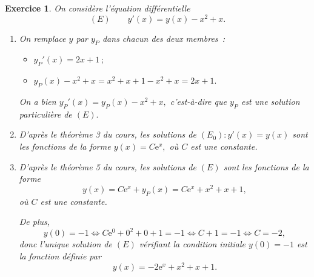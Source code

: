 \documentclass[10pt]{article}
\newtheorem{exo}{Exercice}
\begin{document}
\begin{exo}

On considère l'équation différentielle
\[(E)\qquad y'(x)=y(x)-x^2+x.\]

\begin{enumerate}
\item On remplace $y$ par $y_P$ dans chacun des deux membres~:
\begin{itemize}
\item[\textbullet] $y_P'(x)=2x+1~;$
\item[\textbullet] $ y_P(x)-x^2+x=x^2+x+1-x^2+x=2x+1.$
\end{itemize}

On a bien $y_P'(x)=y_P(x)-x^2+x,$ c'est-à-dire que $y_P$ est une solution particulière de $(E).$
\item D'après le théorème 3 du cours, les solutions de $\left(E_0\right): y'(x)=y(x)$ sont les fonctions de la forme $y(x)=C\text{e}^{x},$ où $C$ est une constante.

\item D'après le théorème 5 du cours, les solutions de $(E)$ sont les fonctions de la forme 
\[y(x)=C\text{e}^{x}+y_P(x)=C\text{e}^{x}+x^2+x+1,\] où $C$ est une constante.

\medskip

De plus,
\[y(0)=-1\iff C\text{e}^0+0^2+0+1=-1\iff C+1=-1\iff C=-2,\]
donc l'unique solution de $(E)$ vérifiant la condition initiale $y(0)=-1$ est la fonction définie par
\[y(x)=-2\text{e}^{x}+x^2+x+1.\]

\end{enumerate}
\end{exo}
\end{document}
